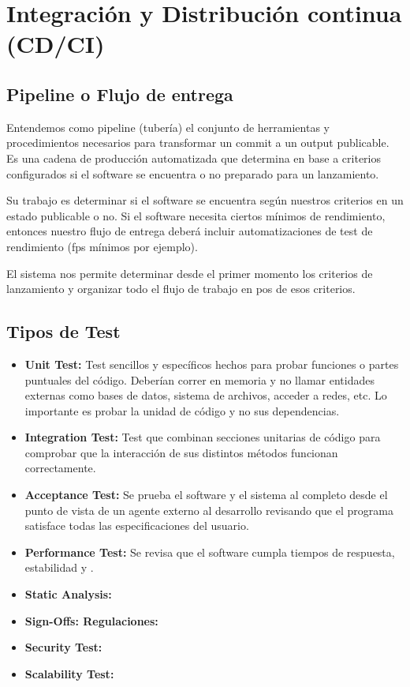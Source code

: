 
\section{Integración y Distribución continua (CD/CI)}\label{pipeline:entrega-continua}

\subsection{Pipeline o Flujo de entrega}\label{pipeline:flujo-de-entrega}

Entendemos como pipeline (tubería) el conjunto de herramientas y procedimientos necesarios para transformar un commit a un output publicable. Es una cadena de producción automatizada que determina en base a criterios configurados si el software se encuentra o no preparado para un lanzamiento.

Su trabajo es determinar si el software se encuentra según nuestros criterios
en un estado publicable o no. Si el software necesita ciertos mínimos de
rendimiento, entonces nuestro flujo de entrega deberá incluir automatizaciones
de test de rendimiento (fps mínimos por ejemplo).

El sistema nos permite determinar desde el primer momento los criterios de
lanzamiento y organizar todo el flujo de trabajo en pos de esos criterios.

\subsection{Tipos de Test}\label{pipeline:tipos-de-test}

\begin{itemize}
  \item \textbf{Unit Test:} Test sencillos y específicos hechos para probar funciones o partes puntuales del código. Deberían correr en memoria y no llamar entidades externas como bases de datos, sistema de archivos, acceder a redes, etc. Lo importante es probar la unidad de código y no sus dependencias.
  \item \textbf{Integration Test:} Test que combinan secciones unitarias de código para comprobar que la interacción de sus distintos métodos funcionan correctamente.
  \item \textbf{Acceptance Test:} Se prueba el software y el sistema al completo desde el punto de vista de un agente externo al desarrollo revisando que el programa satisface todas las especificaciones del usuario.
  \item \textbf{Performance Test:} Se revisa que el software cumpla tiempos de respuesta, estabilidad y .
  \item \textbf{Static Analysis:} 
  \item \textbf{Sign-Offs: Regulaciones:} 
  \item \textbf{Security Test:} 
  \item \textbf{Scalability Test:} 
\end{itemize}

